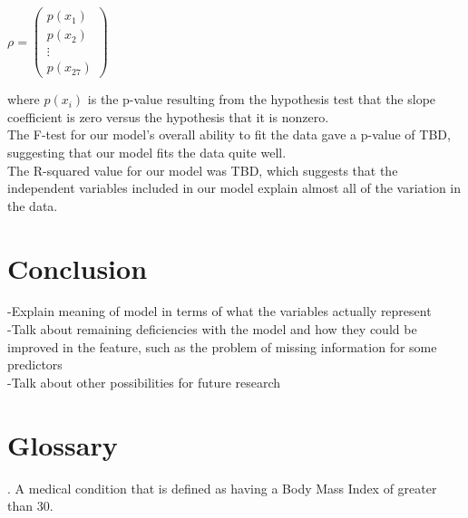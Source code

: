 \documentclass[oneside,12pt]{report}
\begin{document}
\begin{math} \rho =
\begin{pmatrix}
p(x_1) \\ p(x_2) \\ \vdots \\p(x_{27})
\end{pmatrix}
\end{math}

where \begin{math}p(x_i)\end{math} is the p-value resulting from the hypothesis test that the slope coefficient is zero versus the hypothesis that it is nonzero.
\\
The F-test for our model's overall ability to fit the data gave a p-value of TBD, suggesting that our model fits the data quite well.
\\
The R-squared value for our model was TBD, which suggests that the independent variables included in our model explain almost all of the variation in the data.

\chapter{Conclusion}

-Explain meaning of model in terms of what the variables actually represent
\\
-Talk about remaining deficiencies with the model and how they could be improved in the feature, such as the problem of missing information for some predictors
\\
-Talk about other possibilities for future research


\appendix
{}


\chapter{Glossary}\label{Glossary}

\vspace{12pt}

\vspace{8pt}
. A medical condition that is defined as having a Body Mass Index of greater than 30.
\end{document}

